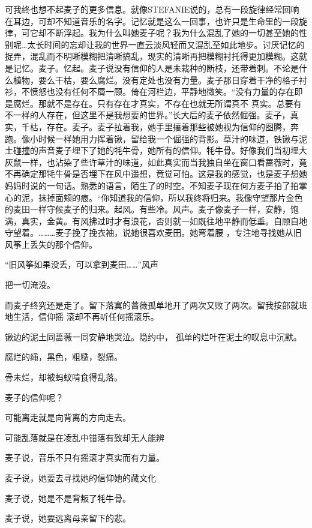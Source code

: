 \documentclass{article}
\begin{document}
可我终也想不起麦子的更多信息。就像STEFANIE说的，总有一段旋律经常回响在耳边，可却不知道音乐的名字。记忆就是这么一回事，也许只是生命里的一段旋律，可它却不断浮起。我为什么叫她麦子呢？我为什么混乱了她的一切甚至她的性别呢…太长时间的忘却让我的世界一直云淡风轻而又混乱至如此地步。讨厌记忆的捉弄，混乱而不明晰模糊把清晰搞乱，现实的清晰再把模糊衬托得更加模糊。这就是记忆。麦子。忆起。麦子说没有信仰的人是未栽种的断枝，还带着刺。不论是什么植物，要么干枯，要么腐烂。没有定处也没有力量。麦子那日穿着干净的格子衬衫，不愤怒也没有任何不屑一顾。倚在河栏边，平静地微笑。“没有力量的存在即是腐烂。那就不是存在。只有存在才真实，不存在也就无所谓真不
\newpage
真实。总要有不一样的人存在，但这里不是我想要的世界。”长大后的麦子依然倔强。麦子，真实，千枯，存在。麦子。麦子拉着我，她手里攘着那些被她视为信仰的图腾，奔跑。像小时候一样她用力挥着锹，留给我一个倔强的背影。草汁的味道，铁锹与泥土碰撞的声音麦子埋下了她的牦牛骨，她所有的信仰。牦牛骨。好像我们当初埋大灰鼠一样，也沾染了些许草汁的味道，如此真实而当我独自坐在窗口看蔷薇时，竟不再确定那牦牛骨是否埋下在风中遥想，竟觉可怕。这是我的感觉，也是麦子想她妈妈时说的一句话。熟悉的语言，陌生了的时空。不知麦子现在何方麦子拍了拍掌心的泥，抹掉面颊的痕。“你知道我的信仰，所以我终将归来。我像守望那片金色的麦田一样守候麦子的归来。起风。有些冷。风声。麦子像麦子一样，安静，饱满，真实，金黄。有风拂过时才有浪花，否则就一如既往地平静而低垂。自顾自地守望着。………麦子挽了挽衣袖，说她很喜欢麦田。她弯着腰
，专注地寻找她从旧风筝上丢失的那个信仰。 

“旧风筝如果没丢，可以拿到麦田……”风声

\newpage
把一切淹没。 

而麦子终究还是走了。留下落寞的蔷薇孤单地开了两次又败了两次。留我按部就班地生活，信仰摇
滚却不再听任何摇滚乐。 

锹边的泥土同蔷薇一同安静地哭泣。隐约中，
孤单的烂叶在泥土的叹息中沉默。 


腐烂的绳，黑色，粗糙，裂痛。 


骨未烂，却被蚂蚁啃食得乱落。 


麦子的信仰呢？ 


可能离走就是向背离的方向走去。 


可能乱落就是在凌乱中错落有致却无人能辨 


麦子说，音乐不只有摇滚才真实而有力量。 


\newpage

麦子说，她要去寻找她的信仰她的藏文化 


麦子说，她是不是背叛了牦牛骨。 


麦子说，她要远离母亲留下的悲。 
\end{document}
